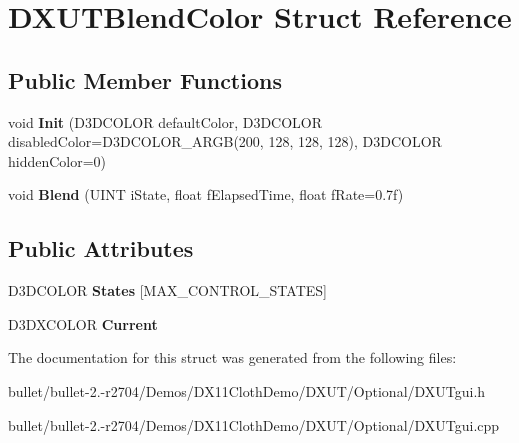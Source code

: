 \hypertarget{struct_d_x_u_t_blend_color}{\section{D\+X\+U\+T\+Blend\+Color Struct Reference}
\label{struct_d_x_u_t_blend_color}
}
\subsection*{Public Member Functions}
\begin{DoxyCompactItemize}
\item 
\hypertarget{struct_d_x_u_t_blend_color_a051081b1395785a67eb7c42322250bfb}{void {\bfseries Init} (D3\+D\+C\+O\+L\+O\+R default\+Color, D3\+D\+C\+O\+L\+O\+R disabled\+Color=D3\+D\+C\+O\+L\+O\+R\+\_\+\+A\+R\+G\+B(200, 128, 128, 128), D3\+D\+C\+O\+L\+O\+R hidden\+Color=0)}\label{struct_d_x_u_t_blend_color_a051081b1395785a67eb7c42322250bfb}

\item 
\hypertarget{struct_d_x_u_t_blend_color_afc4c08815d8727cca9b4995cbbb834d6}{void {\bfseries Blend} (U\+I\+N\+T i\+State, float f\+Elapsed\+Time, float f\+Rate=0.\+7f)}\label{struct_d_x_u_t_blend_color_afc4c08815d8727cca9b4995cbbb834d6}

\end{DoxyCompactItemize}
\subsection*{Public Attributes}
\begin{DoxyCompactItemize}
\item 
\hypertarget{struct_d_x_u_t_blend_color_a460adbd94a1a6d14215e5f674fe4ceb3}{D3\+D\+C\+O\+L\+O\+R {\bfseries States} \mbox{[}M\+A\+X\+\_\+\+C\+O\+N\+T\+R\+O\+L\+\_\+\+S\+T\+A\+T\+E\+S\mbox{]}}\label{struct_d_x_u_t_blend_color_a460adbd94a1a6d14215e5f674fe4ceb3}

\item 
\hypertarget{struct_d_x_u_t_blend_color_a66f7c28adcd07a58903d5637cc591ec1}{D3\+D\+X\+C\+O\+L\+O\+R {\bfseries Current}}\label{struct_d_x_u_t_blend_color_a66f7c28adcd07a58903d5637cc591ec1}

\end{DoxyCompactItemize}


The documentation for this struct was generated from the following files\+:\begin{DoxyCompactItemize}
\item 
bullet/bullet-\/2.-\/r2704/\+Demos/\+D\+X11\+Cloth\+Demo/\+D\+X\+U\+T/\+Optional/D\+X\+U\+Tgui.\+h\item 
bullet/bullet-\/2.-\/r2704/\+Demos/\+D\+X11\+Cloth\+Demo/\+D\+X\+U\+T/\+Optional/D\+X\+U\+Tgui.\+cpp\end{DoxyCompactItemize}
